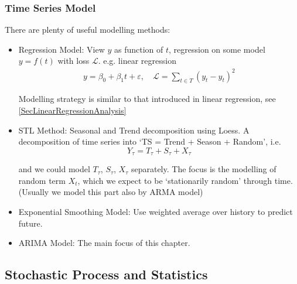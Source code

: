 \subsubsection{Time Series Model}
    There are plenty of useful modelling methods:
    \begin{itemize}[topsep=2pt,itemsep=0pt]
        \item Regression Model: View $ y $ as function of $ t $, regression on some model $ y=f(t) $ with loss $ \mathcal{L} $. e.g. linear regression
        \begin{align}
            y=\beta _0+\beta _1t+\varepsilon ,\quad \mathcal{L}=\sum_{t\in T}(y_t-\hat{y}_t)^2 
        \end{align}
        
        Modelling strategy is similar to that introduced in linear regression, see \autoref{SecLinearRegressionAnalysis} 
        
        \item STL Method: Seasonal and Trend decomposition using Loess. A decomposition of time series into `TS = Trend + Season + Random', i.e.
        \begin{equation}
            Y_\tau=T_\tau+S_\tau+X_\tau 
        \end{equation}
    
        and we could model $ T_\tau $, $ S_{\tau} $, $ X_\tau $ separately. The focus is the modelling of random term $ X_t $, which we expect to be `stationarily random' through time. (Usually we model this part also by ARMA model)

        \item Exponential Smoothing Model: Use weighted average over history to predict future.

        \item ARIMA Model: The main focus of this chapter.
    \end{itemize}
    






\subsection{Stochastic Process and Statistics}\label{SubSectionStochasticProcessForTimeSeries}
